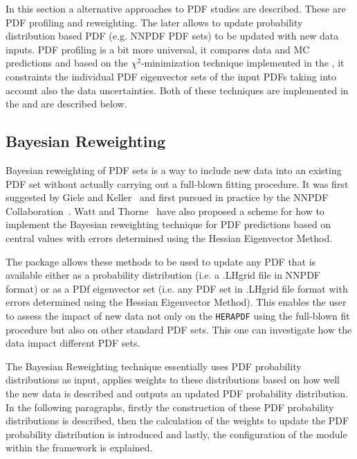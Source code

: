 In this section a alternative approaches to PDF studies are described. These are PDF profiling and reweighting. The later allows to update probability distribution based PDF (e.g. NNPDF PDF sets) to be updated with new data inputs. PDF profiling is a bit more universal, it compares data and MC predictions and based on the $\chi^2$-minimization technique implemented in the \fitter, it constraints the individual PDF eigenvector sets of the input PDFs taking into account also the data uncertainties. Both of these techniques are implemented in the \fitter and are described below.


\subsection{Bayesian Reweighting}

Bayesian reweighting of PDF sets is a way to include new data into an existing PDF set without actually carrying out a full-blown fitting procedure. 
It was first suggested by Giele and Keller~\cite{Giele:1998gw} and first pursued in practice by the NNPDF Collaboration~\cite{Ball:2011gg,Ball:2010gb}. 
Watt and Thorne~\cite{Watt:2012tq} have also proposed a scheme for how to implement the Bayesian reweighting technique for PDF predictions based on central values with errors determined using the Hessian Eigenvector Method. 

%
The \fitter package allows these methods to be used to update any PDF that is available either as a probability distribution
(i.e. a \lhapdf .LHgrid file in NNPDF format) or as a PDf eigenvector set 
(i.e. any PDF set in \lhapdf .LHgrid file format with errors determined using the Hessian Eigenvector Method).
This enables the user to assess the impact of new data not only on the {\tt HERAPDF} using the full-blown fit procedure 
but also on other standard PDF sets. This one can investigate how the data impact different PDF sets.

The Bayesian Reweighting technique essentially uses PDF probability distributions as input, applies weights to these distributions based on how well the new data is described and outputs an updated PDF probability distribution. In the following paragraphs, firstly the construction of these PDF probability distributions is described, then the calculation of the weights to update the PDF probability distribution is introduced and lastly, the configuration of the module within the \fitter framework is explained.

